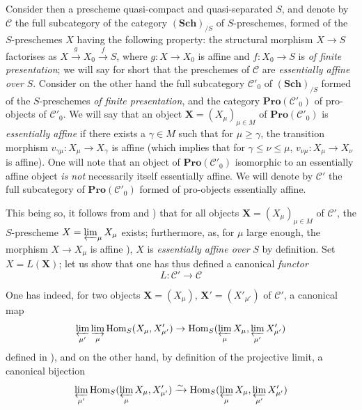 \begin{env}[8.13.4]
\label{IV.8.13.4}
Consider then a prescheme quasi-compact and quasi-separated $S$, and denote by $\mathcal{C}$ the full subcategory of the category $(\mathbf{Sch})_{/S}$ of $S$-preschemes, formed of the $S$-preschemes $X$ having the following property: the structural morphism $X\to S$ factorises as $X\xrightarrow{g}X_0\xrightarrow{f}S$, where $g:X\to X_0$ is affine and $f:X_0\to S$ is \emph{of finite presentation}; we will say for short that the preschemes of $\mathcal{C}$ are \emph{essentially affine over} $S$.
Consider on the other hand the full subcategory $\mathcal{C}'_0$ of $(\mathbf{Sch})_{/S}$ formed of the $S$-preschemes \emph{of finite presentation}, and the category $\mathbf{Pro}(\mathcal{C}'_0)$ of pro-objects of $\mathcal{C}'_0$.
We will say that an object $\mathbf{X}=(X_\mu)_{\mu\in M}$ of $\mathbf{Pro}(\mathcal{C}'_0)$ is \emph{essentially affine} if there exists a $\gamma\in M$ such that for $\mu\geqslant\gamma$, the transition morphism $v_{\gamma\mu}:X_\mu\to X_\gamma$ is affine (which implies that for $\gamma\leqslant\nu\leqslant\mu$, $v_{\nu\mu}:X_\mu\to X_\nu$ is affine).
One will note that an object of $\mathbf{Pro}(\mathcal{C}'_0)$ isomorphic to an essentially affine object \emph{is not} necessarily itself essentially affine.
We will denote by $\mathcal{C}'$ the full subcategory of $\mathbf{Pro}(\mathcal{C}'_0)$ formed of pro-objects essentially affine.

This being so, it follows from  and ) that for all objects $\mathbf{X}=(X_\mu)_{\mu\in M}$ of $\mathcal{C}'$, the $S$-prescheme $X=\varprojlim_\mu X_\mu$ exists; furthermore, as, for $\mu$ large enough, the morphism $X\to X_\mu$ is affine ), $X$ is \emph{essentially affine over} $S$ by definition.
Set $X=L(\mathbf{X})$; let us show that one has thus defined a canonical \emph{functor}
\begin{equation}
\label{IV.8.13.4.1}
L:\mathcal{C}'\to\mathcal{C} \tag{8.13.4.1}
\end{equation}


One has indeed, for two objects $\mathbf{X}=(X_\mu)$, $\mathbf{X}'=(X'_{\mu'})$ of $\mathcal{C}'$, a canonical map
\[
\varprojlim_{\mu'}\varinjlim_\mu\operatorname{Hom}_S(X_\mu,X'_{\mu'})\to\operatorname{Hom}_S(\varprojlim_\mu X_\mu,\varprojlim_{\mu'}X'_{\mu'})
\]
defined in ), and on the other hand, by definition of the projective limit, a canonical bijection
\[
\varprojlim_{\mu'}\operatorname{Hom}_S(\varprojlim_\mu X_\mu,X'_{\mu'})\xrightarrow{\sim}\operatorname{Hom}_S(\varprojlim_\mu X_\mu,\varprojlim_{\mu'}X'_{\mu'})
\]
\end{env}

